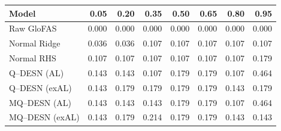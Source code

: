 \begin{tabular}{lrrrrrrr}
\toprule
Model & 0.05 & 0.20 & 0.35 & 0.50 & 0.65 & 0.80 & 0.95 \\
\midrule
Raw GloFAS & 0.000 & 0.000 & 0.000 & 0.000 & 0.000 & 0.000 & 0.000 \\
Normal Ridge & 0.036 & 0.036 & 0.107 & 0.107 & 0.107 & 0.107 & 0.107 \\
Normal RHS & 0.107 & 0.107 & 0.107 & 0.107 & 0.107 & 0.107 & 0.179 \\
Q--DESN (AL) & 0.143 & 0.143 & 0.107 & 0.179 & 0.179 & 0.107 & 0.464 \\
Q--DESN (exAL) & 0.143 & 0.179 & 0.179 & 0.179 & 0.179 & 0.143 & 0.179 \\
MQ--DESN (AL) & 0.143 & 0.143 & 0.143 & 0.179 & 0.179 & 0.107 & 0.464 \\
MQ--DESN (exAL) & 0.143 & 0.179 & 0.214 & 0.179 & 0.179 & 0.143 & 0.143 \\
\bottomrule
\end{tabular}
